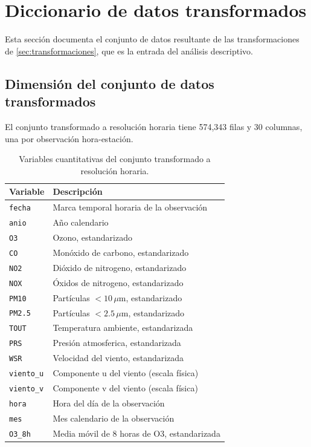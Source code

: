 \section{Diccionario de datos transformados}\label{sec:diccionario-transformado}
Esta sección documenta el conjunto de datos resultante de las transformaciones
de \cref{sec:transformaciones}, que es la entrada del análisis descriptivo.

\subsection{Dimensión del conjunto de datos transformados}
El conjunto transformado a resolución horaria tiene 574,343 filas y 30
columnas, una por observación hora-estación.

\begin{table}[t]
  \centering
  \caption{Variables cuantitativas del conjunto transformado a resolución
    horaria.}
  \label{tab:dic-horario-cuantitativas}
  \small
  \begin{tabular}{lp{5.4cm}}
    \toprule
    Variable & Descripción \\
    \midrule
    \texttt{fecha}     & Marca temporal horaria de la observación \\
    \texttt{anio}      & Año calendario                          \\
    \texttt{O3}        & Ozono, estandarizado                    \\
    \texttt{CO}        & Monóxido de carbono, estandarizado      \\
    \texttt{NO2}       & Dióxido de nitrogeno, estandarizado      \\
    \texttt{NOX}       & Óxidos de nitrogeno, estandarizado       \\
    \texttt{PM10}      & Partículas $<10\,\mu$m, estandarizado    \\
    \texttt{PM2.5}     & Partículas $<2.5\,\mu$m, estandarizado    \\
    \texttt{TOUT}      & Temperatura ambiente, estandarizada      \\
    \texttt{PRS}       & Presión atmosferica, estandarizada        \\
    \texttt{WSR}       & Velocidad del viento, estandarizada      \\
    \texttt{viento\_u} & Componente u del viento (escala física)   \\
    \texttt{viento\_v} & Componente v del viento (escala física)   \\
    \texttt{hora}      & Hora del día de la observación           \\
    \texttt{mes}       & Mes calendario de la observación          \\
    \texttt{O3\_8h}    & Media móvil de 8 horas de O3, estandarizada  \\
    \bottomrule
  \end{tabular}
\end{table}

